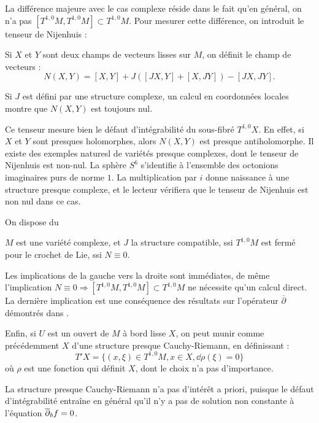 La différence majeure avec le cas complexe réside dans le fait qu'en général, on n'a pas $[T^{1,0}M, T^{1,0}M]\subset T^{1,0}M$. Pour mesurer cette différence, on introduit le tenseur de Nijenhuis :

\begin{defn}
	Si $X$ et $Y$ sont deux champs de vecteurs lisses sur $M$, on définit le champ de vecteurs :
	\begin{equation*}
		N(X,Y)=[X,Y]+J([JX,Y] + [X,JY]) - [JX,JY].
	\end{equation*}
\end{defn}
Si $J$ est défini par une structure complexe, un calcul en coordonnées locales montre que $N(X,Y)$ est toujours nul.

Ce tenseur mesure bien le défaut d'intégrabilité du sous-fibré $T^{1,0}X$. En effet, si $X$ et $Y$ sont presques holomorphes, alors $N(X,Y)$ est presque antiholomorphe. Il existe des exemples naturesl de variétés presque complexes, dont le tenseur de Nijenhuis est non-nul. La sphère $S^6$ s'identifie à l'ensemble des octonions imaginaires purs de norme $1$. La multiplication par $i$ donne naissance à une structure presque complexe, et le lecteur vérifiera que le tenseur de Nijenhuis est non nul dans ce cas. 

On dispose du

\begin{theorem}
	$M$ est une variété complexe, et $J$ la structure compatible, ssi $T^{1,0}M$ est fermé pour le crochet de Lie, ssi $N \equiv 0$.
\end{theorem}
	Les implications de la gauche vers la droite sont immédiates, de même l'implication $N \equiv 0 \Rightarrow [T^{1,0}M,T^{1,0}M]\subset T^{1,0}M$ ne nécessite qu'un calcul direct. La dernière implication est une conséquence des résultats sur l'opérateur $\overline{\partial}$ démontrés dans \cite{kohn1963harmonic}.
	
	Enfin, si $U$ est un ouvert de $M$ à bord lisse $X$, on peut munir comme précédemment $X$ d'une structure presque Cauchy-Riemann, en définissant :
	\begin{equation*}
		T'X=\{(x,\xi)\in T^{1,0}M, x\in X, \dd \rho(\xi)=0 \}
	\end{equation*}
	où $\rho$ est une fonction qui définit $X$, dont le choix n'a pas d'importance.
	
	La structure presque Cauchy-Riemann n'a pas d'intérêt a priori, puis\-que le défaut d'intégrabilité entraîne en général qu'il n'y a pas de solution non constante à l'équation $\overline{\partial}_b f =0$.
	
